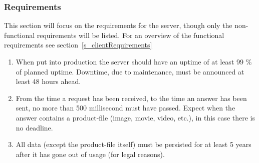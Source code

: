 \subsubsection{Requirements}
\label{s_serviceRequirements}
This section will focus on the requirements for the server, though only the non-functional requirements will be listed. For an overview of the functional requirements see section~\ref{s_clientRequirements}
\\
\begin{enumerate}
	\item When put into production the server should have an uptime of at least 99 \% of planned uptime. Downtime, due to maintenance, must be announced at least 48 hours ahead.
	\item From the time a request has been received, to the time an answer has been sent, no more than 500 millisecond must have passed. Expect when the answer contains a product-file (image, movie, video, etc.), in this case there is no deadline.
	\item All data (except the product-file itself) must be persisted for at least 5 years after it has gone out of usage (for legal reasons).
\end{enumerate}